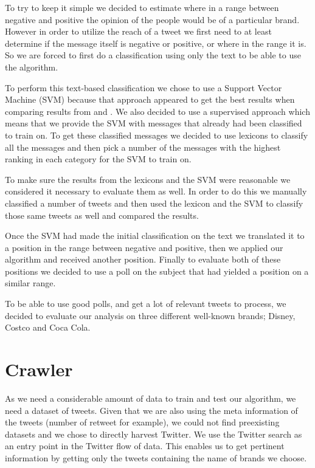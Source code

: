 \documentclass[a4paper,12pt]{report}
\begin{document}
To try to keep it simple we decided to estimate where in a range between negative and positive the opinion of the people would be of a particular brand.
However in order to utilize the reach of a tweet we first need to at least determine if the message itself is negative or positive, or where in the range it is.
So we are forced to first do a classification using only the text to be able to use the algorithm.

To perform this text-based classification we chose to use a Support Vector Machine (SVM) because that approach appeared to get the best results when comparing results from \cite{Pang02} and \cite{Turney02}.
We also decided to use a supervised approach which means that we provide the SVM with messages that already had been classified to train on.
To get these classified messages we decided to use lexicons to classify all the messages and then pick a number of the messages with the highest ranking in each category for the SVM to train on.

To make sure the results from the lexicons and the SVM were reasonable we considered it necessary to evaluate them as well. 
In order to do this we manually classified a number of tweets and then used the lexicon and the SVM to classify those same tweets as well and compared the results.

Once the SVM had made the initial classification on the text we translated it to a position in the range between negative and positive, then we applied our algorithm and received another position. Finally to evaluate both of these positions we decided to use a poll on the subject that had yielded a position on a similar range.

To be able to use good polls, and get a lot of relevant tweets to process, we decided to evaluate our analysis on three different well-known brands; Disney, Costco and Coca Cola.

\section{Crawler}

As we need a considerable amount of data to train and test our algorithm, we need a dataset of tweets. Given that we are also using the meta information of the tweets (number of retweet for example), we could not find preexisting datasets and we chose to directly harvest Twitter.
We use the Twitter search as an entry point in the Twitter flow of data. This enables us to get pertinent information by getting only the tweets containing the name of brands we choose.
\end{document}
